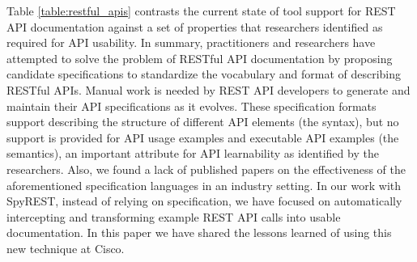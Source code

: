 \documentclass[10pt, conference]{IEEEtran}
\begin{document}
Table \ref{table:restful_apis} contrasts the current state of tool support for REST API documentation against a set of properties that researchers identified as required for API usability. In summary, practitioners and researchers have attempted to solve the problem of RESTful API documentation by proposing candidate specifications to standardize the vocabulary and format of describing RESTful APIs. Manual work is needed by REST API developers to generate and maintain their API specifications as it evolves. These specification formats support describing the structure of different API elements (the syntax), but no support is provided for API usage examples and executable API examples (the semantics), an important attribute for API learnability as identified by the researchers. Also, we found a lack of published papers on the effectiveness of the aforementioned specification languages in an industry setting. In our work with SpyREST, instead of relying on specification, we have focused on automatically intercepting and transforming example REST API calls into usable documentation. In this paper we have shared the lessons learned of using this new technique at Cisco.


%
%

\end{document}
